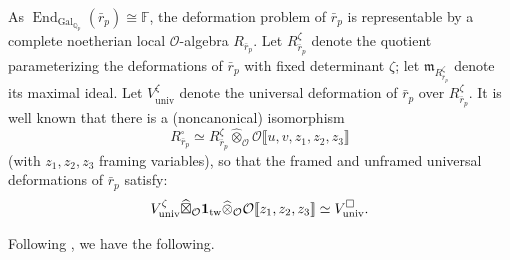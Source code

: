 \documentclass[12pt]{amsart}
\theoremstyle{definition}
\numberwithin{equation}{subsection}
\def\calO{\mathcal{O}}
\def\gothm{\mathfrak{m}}
\def\FF{\mathbb{F}}
\def\QQ{\mathbb{Q}}
\DeclareMathOperator{\End}{End}
\DeclareMathOperator{\Gal}{Gal}
\newcommand{\univ}{\mathrm{univ}}
\begin{document}
As $\End_{\Gal_{\QQ_p}}(\bar r_p) \cong \FF$, the deformation problem of $\bar r_p$ is representable by a complete noetherian local $\calO$-algebra $R_{\bar r_p}$.  Let $R_{\bar r_p}^\zeta$ denote the quotient parameterizing the deformations of $\bar r_p$ with fixed determinant $\zeta$; let $\gothm_{R_{\bar r_p}^\zeta}$ denote its maximal ideal. Let $V_\univ^\zeta$ denote the universal deformation of $\bar r_p$ over $R_{\bar r_p}^\zeta$.  It is well known that there is a (noncanonical) isomorphism
$$
R_{\bar r_p}^\square \simeq R_{\bar r_p}^\zeta \widehat \otimes_\calO \calO\llbracket u, v, z_1, z_2, z_3\rrbracket
$$
(with $z_1, z_2, z_3$ framing variables),
so that the framed and unframed universal deformations of $\bar r_p$ satisfy:
$$
V_\univ^\zeta \widehat{\boxtimes}_\calO {\bf 1}_\mathrm{tw} \widehat \otimes_\calO \calO\llbracket z_1, z_2 , z_3\rrbracket \simeq V_\univ^\square.
$$


Following \cite[\S\,8]{paskunas-functor}, we have the following.   
\end{document}
